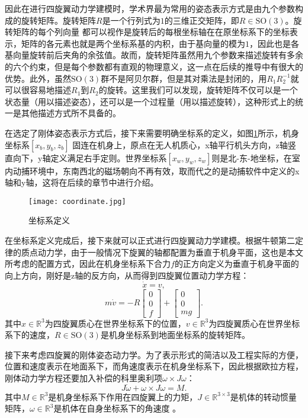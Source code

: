 因此在进行四旋翼动力学建模时，学术界最为常用的姿态表示方式是由九个参数构成的旋转矩阵。旋转矩阵$R$是一个行列式为$1$的三维正交矩阵，即$R\in \text{SO}(3)$。旋转矩阵的每个列向量  都可以视作是旋转后的每根坐标轴在在原坐标系下的坐标表示，矩阵的各元素也就是两个坐标系基的内积，由于基向量的模为$1$，因此也是各基向量旋转前后夹角的余弦值。故而，旋转矩阵虽然用九个参数来描述旋转有多余的六个约束，但是每个参数都有直观的物理意义，这一点在后续的推导中有很大的优势。此外，虽然$\text{SO}(3)$群不是阿贝尔群，但是其对乘法是封闭的，用$R_1R_2^{-1}$就可以很容易地描述$R_1$到$R_2$的旋转。这里我们可以发现，旋转矩阵不仅可以是一个状态量（用以描述姿态），还可以是一个过程量（用以描述旋转），这种形式上的统一是其他描述方式所不具备的。

在选定了刚体姿态表示方式后，接下来需要明确坐标系的定义，如图\ref{fig:1}所示，机身坐标系$[x_b,y_b,z_b]$ 固连在机身上，原点在无人机质心，x轴平行机头方向，z轴竖直向下，y轴定义满足右手定则。世界坐标系$[x_w,y_w,z_w]$则是北-东-地坐标，在室内动捕环境中，东南西北的磁场朝向不再有效，取而代之的是动捕软件中定义的x轴和y轴，这将在后续的章节中进行介绍。
\begin{figure}[!h]
    \centering
    \texttt{[image: coordinate.jpg]}
    \caption{坐标系定义}
    \label{fig:1}
  \end{figure}

在坐标系定义完成后，接下来就可以正式进行四旋翼动力学建模。根据牛顿第二定律的质点动力学，由于一般情况下旋翼的轴都配置为垂直于机身平面，这也是本文所考虑的配置方式，因此在机身坐标系下合力$f$的正方向定义为垂直于机身平面的向上方向，刚好是z轴的反方向，从而得到四旋翼位置动力学方程：
  \begin{equation}
    \dot x=v,
    \label{equ:x}
  \end{equation}
  \begin{equation}
    m \dot v=-R \begin{bmatrix} 0\\ 0\\ f \end{bmatrix}+\begin{bmatrix} 0\\ 0\\ mg\end{bmatrix}. 
    \label{equ:a}
  \end{equation}
其中$x\in \mathbb{R}^{3}$为四旋翼质心在世界坐标系下的位置，$v\in \mathbb{R}^{3}$为四旋翼质心在世界坐标系下的速度，$R \in \text{SO}(3)$是机身坐标系到地面坐标系的旋转矩阵。

接下来考虑四旋翼的刚体姿态动力学。为了表示形式的简洁以及工程实际的方便，位置和速度表示在地面系下，而角速度表示在机身坐标系下，因此根据欧拉方程，刚体动力学方程还要加入补偿的科里奥利项$\omega \times J \omega$：
  \begin{equation}
  J \dot\omega +\omega \times J \omega  =M.
    \label{equ:M}
  \end{equation}
其中$M\in \mathbb{R}^{3}$是机身坐标系下作用在四旋翼上的力矩，$J\in \mathbb{R}^{3 \times 3}$是机体的转动惯量矩阵，$\omega \in \mathbb{R}^{3}$是机体在自身坐标系下的角速度 。

